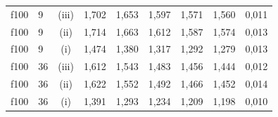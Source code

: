 \begin{tabular}{llc ccccc c}
f100 & 9 & (iii) & 1{,}702 & 1{,}653 & 1{,}597 & 1{,}571 & 1{,}560 & 0{,}011\\
f100 & 9 & (ii) & 1{,}714 & 1{,}663 & 1{,}612 & 1{,}587 & 1{,}574 & 0{,}013\\
f100 & 9 & (i) & 1{,}474 & 1{,}380 & 1{,}317 & 1{,}292 & 1{,}279 & 0{,}013\\
f100 & 36 & (iii) & 1{,}612 & 1{,}543 & 1{,}483 & 1{,}456 & 1{,}444 & 0{,}012\\
f100 & 36 & (ii) & 1{,}622 & 1{,}552 & 1{,}492 & 1{,}466 & 1{,}452 & 0{,}014\\
f100 & 36 & (i) & 1{,}391 & 1{,}293 & 1{,}234 & 1{,}209 & 1{,}198 & 0{,}010\\
\bottomrule
\end{tabular}
